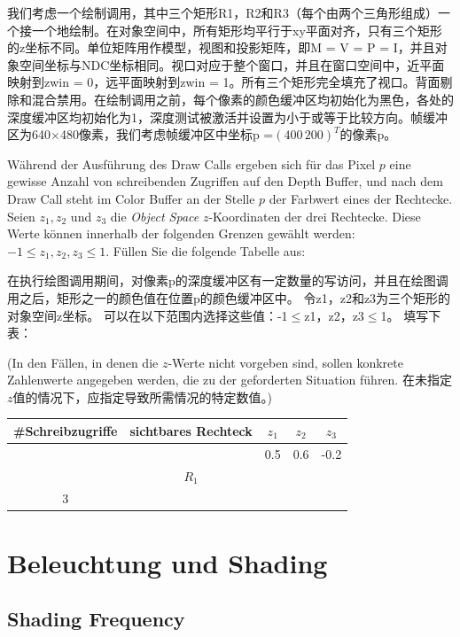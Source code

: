 \documentclass[fleqn]{article}
\begin{document}
我们考虑一个绘制调用，其中三个矩形R1，R2和R3（每个由两个三角形组成）一个接一个地绘制。在对象空间中，所有矩形均平行于xy平面对齐，只有三个矩形的z坐标不同。单位矩阵用作模型，视图和投影矩阵，即M = V = P = I，并且对象空间坐标与NDC坐标相同。视口对应于整个窗口，并且在窗口空间中，近平面映射到zwin = 0，远平面映射到zwin = 1。所有三个矩形完全填充了视口。背面剔除和混合禁用。在绘制调用之前，每个像素的颜色缓冲区均初始化为黑色，各处的深度缓冲区均初始化为1，深度测试被激活并设置为小于或等于比较方向。帧缓冲区为640$\times$480像素，我们考虑帧缓冲区中坐标p =$(400\, 200)^T$的像素p。

Während der Ausführung des Draw Calls ergeben sich für das Pixel $p$ eine gewisse Anzahl
 von schreibenden Zugriffen auf den Depth Buffer, und nach dem Draw Call steht im Color 
 Buffer an der Stelle $p$ der Farbwert eines der Rechtecke. Seien $z_1, z_2$ und $z_3$ die 
 \textit{Object Space} $z$-Koordinaten der drei Rechtecke. Diese Werte können innerhalb 
 der folgenden Grenzen gewählt werden: $−1 \leq z_1, z_2, z_3 \leq 1$. Füllen Sie die folgende Tabelle aus:

 在执行绘图调用期间，对像素p的深度缓冲区有一定数量的写访问，并且在绘图调用之后，矩形之一的颜色值在位置p的颜色缓冲区中。 令z1，z2和z3为三个矩形的对象空间z坐标。 可以在以下范围内选择这些值：-1$\leq$z1，z2，z3$\leq$1。 填写下表：

(In den Fällen, in denen die $z$-Werte nicht vorgeben sind, sollen konkrete Zahlenwerte angegeben werden, die zu der geforderten Situation führen. 在未指定$ z $值的情况下，应指定导致所需情况的特定数值。)

\begin{center}
    \begin{tabular}{|c|c|c|c|c|}
        \hline
        \textbf{\#Schreibzugriffe} & \textbf{sichtbares Rechteck}&\qquad$z_1$\qquad\qquad&\qquad$z_2$\qquad\qquad&\qquad$z_3$\qquad\qquad\\
        \hline
        &&0.5&0.6&-0.2\\
        \hline
        &$R_1$&&&\\
        \hline
        3&&&&\\
        \hline
    \end{tabular}
\end{center}

\section{Beleuchtung und Shading}

\subsection{Shading Frequency}
\end{document}
